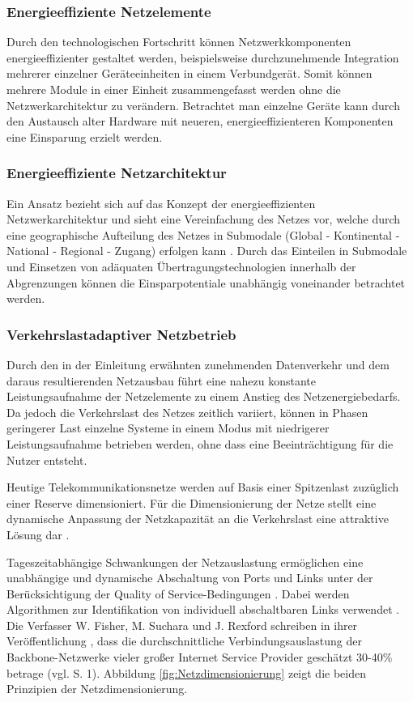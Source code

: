 \subsubsection{Energieeffiziente Netzelemente}
Durch den technologischen Fortschritt können Netzwerkkomponenten energieeffizienter gestaltet werden, beispielsweise durchzunehmende Integration mehrerer einzelner Geräte\-einheiten in einem Verbundgerät. Somit können mehrere Module in einer Einheit zusammengefasst werden ohne die Netzwerkarchitektur zu verändern. Betrachtet man einzelne Geräte kann durch den Austausch alter Hardware mit neueren, energieeffizienteren Komponenten eine Einsparung erzielt werden. 

\subsubsection{Energieeffiziente Netzarchitektur}
Ein Ansatz bezieht sich auf das Konzept der energieeffizienten Netzwerkarchitektur und sieht eine Vereinfachung des Netzes vor, welche durch eine geographische Aufteilung des Netzes in Submodale (Global - Kontinental - National - Regional - Zugang) erfolgen kann \cite{aleksic2014}. Durch das Einteilen in Submodale und Einsetzen von adäquaten Übertragungs\-technologien innerhalb der Abgrenzungen können die Einsparpotentiale unabhängig voneinander betrachtet werden.

\subsubsection{Verkehrslastadaptiver Netzbetrieb}

Durch den in der Einleitung erwähnten zunehmenden Datenverkehr und dem daraus resultierenden Netzausbau führt eine nahezu konstante Leistungsaufnahme der Netzelemente zu einem Anstieg des Netzenergiebedarfs. Da jedoch die Verkehrslast des Netzes zeitlich variiert, können in Phasen geringerer Last einzelne Systeme in einem Modus mit niedrigerer Leistungsaufnahme betrieben werden, ohne dass eine Beeinträchtigung für die Nutzer entsteht.

Heutige Telekommunikationsnetze werden auf Basis einer Spitzenlast zuzüglich einer Reserve dimensioniert. Für die Dimensionierung der Netze stellt eine dynamische Anpassung der Netzkapazität an die Verkehrslast eine attraktive Lösung dar \cite{lange}.

Tageszeitabhängige Schwankungen der Netzauslastung ermöglichen eine unabhängige und dynamische Abschaltung von Ports und Links unter der Berücksichtigung der Quality of Service-Bedingungen \cite{aleksic2013}. Dabei werden Algorithmen zur Identifikation von individuell abschaltbaren Links verwendet \cite{fassnacht}. Die Verfasser W. Fisher, M. Suchara und J. Rexford schreiben in ihrer Veröffentlichung , dass die durchschnittliche Verbindungsauslastung der Backbone-Netzwerke vieler großer Internet Service Provider geschätzt 30-40\% betrage (vgl. \cite{fisher} S. 1). Abbildung \ref{fig:Netzdimensionierung} zeigt die beiden Prinzipien der Netzdimensionierung.

